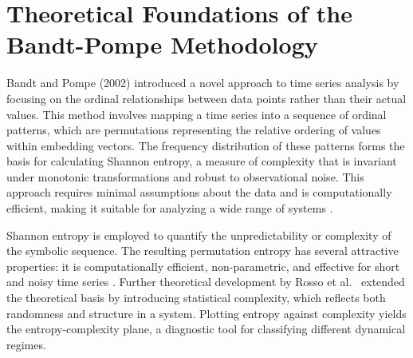 
\section{Theoretical Foundations of the Bandt-Pompe Methodology}
Bandt and Pompe (2002) \cite{PhysRevLett.88.174102} introduced a novel approach to time series analysis by focusing on the ordinal relationships between data points rather than their actual values. This method involves mapping a time series into a sequence of ordinal patterns, which are permutations representing the relative ordering of values within embedding vectors. The frequency distribution of these patterns forms the basis for calculating Shannon entropy, a measure of complexity that is invariant under monotonic transformations and robust to observational noise. This approach requires minimal assumptions about the data and is computationally efficient, making it suitable for analyzing a wide range of systems \cite{Zanin2012}.

Shannon entropy is employed to quantify the unpredictability or complexity of the symbolic sequence. The resulting permutation entropy has several attractive properties: it is computationally efficient, non-parametric, and effective for short and noisy time series \cite{PhysRevLett.88.174102, Zanin2012}. Further theoretical development by Rosso et al.~\cite{Rosso2007} extended the theoretical basis by introducing statistical complexity, which reflects both randomness and structure in a system. Plotting entropy against complexity yields the entropy-complexity plane, a diagnostic tool for classifying different dynamical regimes.

